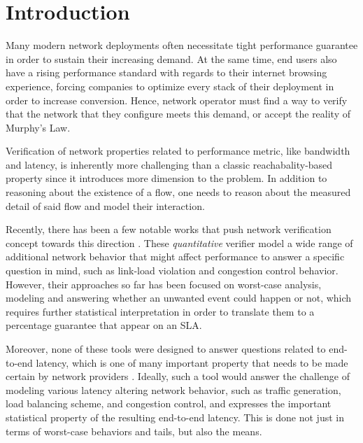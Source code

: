 \section{Introduction}

Many modern network deployments often necessitate tight performance guarantee in order to sustain 
their increasing demand.
At the same time, end users also have a rising performance standard with regards to their internet browsing 
experience, forcing companies to optimize every stack of their deployment in order to increase conversion.
Hence, network operator must find a way to verify that the network that they configure meets this demand, or 
accept the reality of Murphy's Law.

Verification of network properties related to performance metric, like bandwidth and latency, is inherently 
more challenging than a classic reachabality-based property since it introduces more dimension to the problem.
In addition to reasoning about the existence of a flow, one needs to reason about the measured 
detail of said flow and model their interaction.

Recently, there has been a few notable works that push network verification concept towards this direction 
\cite{qarc}\cite{pita}\cite{ccac}.
These \textit{quantitative} verifier model a wide range of additional network behavior that might affect 
performance to answer a specific question in mind, such as link-load violation and congestion control behavior.
However, their approaches so far has been focused on worst-case analysis, modeling and answering whether 
an unwanted event could happen or not, which requires further statistical interpretation in order to translate 
them to a percentage guarantee that appear on an SLA.

Moreover, none of these tools were designed to answer questions related to end-to-end latency, 
which is one of many important property that needs to be made certain by network providers \cite{Verizon}.
Ideally, such a tool would answer the challenge of modeling various latency altering network behavior, 
such as traffic generation, load balancing scheme, and congestion control, and expresses the important 
statistical property of the resulting end-to-end latency.
This is done not just in terms of worst-case behaviors and tails, but also the means.

